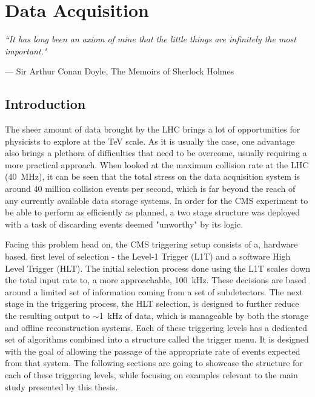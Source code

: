 \chapter{Data Acquisition}
\label{ch:daq}
\setlength{}
\setlength\epigraphrule{0pt}
\epigraph{\itshape``It has long been an axiom of mine that the little things are infinitely the most important."}{--- \textup{Sir Arthur Conan Doyle, The Memoirs of Sherlock Holmes}}
\section{Introduction}
\hspace{10pt} The sheer amount of data brought by the LHC brings a lot of opportunities for physicists to explore at the TeV scale. As it is usually the case, one advantage also brings a plethora of difficulties that need to be overcome, usually requiring a more practical approach. When looked at the maximum collision rate at the LHC (40~MHz), it can be seen that the total stress on the data acquisition system is around 40 million collision events per second, which is far beyond the reach of any currently available data storage systems. In order for the CMS experiment to be able to perform as efficiently as planned, a two stage structure was deployed with a task of discarding events deemed "unworthy" by its logic.

\hspace{10pt} Facing this problem head on, the CMS triggering setup consists of a, hardware based, first level of selection - the Level-1 Trigger (L1T) and a software High Level Trigger (HLT). The initial selection process done using the L1T scales down the total input rate to, a more approachable, 100~kHz. These decisions are based around a limited set of information coming from a set of subdetectors. The next stage in the triggering process, the HLT selection, is designed to further reduce the resulting output to $\sim$1~kHz of data, which is manageable by both the storage and offline reconstruction systems. Each of these triggering levels has a dedicated set of algorithms combined into a structure called the trigger menu. It is designed with the goal of allowing the passage of the appropriate rate of events expected from that system. The following sections are going to showcase the structure for each of these triggering levels, while focusing on examples relevant to the main study presented by this thesis.


